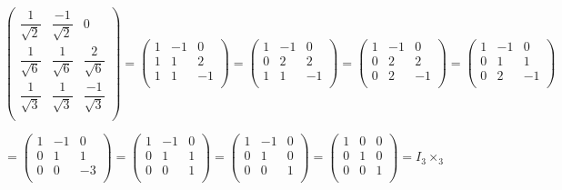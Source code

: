 \documentclass[fleqn]{article}
\begin{document}
\begin{enumerate}
\begin{enumerate}
  \noindent
  $\displaystyle
    \begin{pmatrix}
      \dfrac{1}{\sqrt{2}} & \dfrac{-1}{\sqrt{2}} & 0 \\
      \dfrac{1}{\sqrt{6}} & \dfrac{1}{\sqrt{6}} & \dfrac{2}{\sqrt{6}} \\ 
      \dfrac{1}{\sqrt{3}} & \dfrac{1}{\sqrt{3}} & \dfrac{-1}{\sqrt{3}} \\ 
    \end{pmatrix}
    =
    \begin{pmatrix}
      1 & -1 & 0\\
      1 & 1 & 2\\ 
      1 & 1 & -1\\ 
    \end{pmatrix}
    = 
    \begin{pmatrix}
      1 & -1 & 0\\
      0 & 2 & 2\\ 
      1 & 1 & -1\\ 
    \end{pmatrix}
    = 
    \begin{pmatrix}
      1 & -1 & 0\\
      0 & 2 & 2\\ 
      0 & 2 & -1\\ 
    \end{pmatrix}
    = 
    \begin{pmatrix}
      1 & -1 & 0\\
      0 & 1 & 1\\ 
      0 & 2 & -1\\ 
    \end{pmatrix}
  $
  
  \noindent
  $\displaystyle
    =
    \begin{pmatrix}
      1 & -1 & 0\\
      0 & 1 & 1\\ 
      0 & 0 & -3\\ 
    \end{pmatrix}
    =
    \begin{pmatrix}
      1 & -1 & 0\\
      0 & 1 & 1\\ 
      0 & 0 & 1\\ 
    \end{pmatrix}
    =
    \begin{pmatrix}
      1 & -1 & 0\\
      0 & 1 & 0\\ 
      0 & 0 & 1\\ 
    \end{pmatrix}
    =
    \begin{pmatrix}
      1 & 0 & 0\\
      0 & 1 & 0\\ 
      0 & 0 & 1\\ 
    \end{pmatrix}
    =
    I_3\times_3
  $
  

\end{enumerate}
\end{enumerate}
\end{document}

